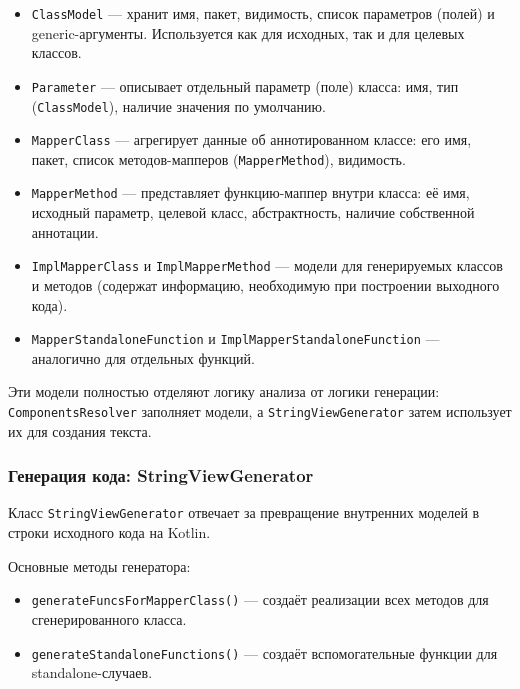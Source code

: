 \begin{itemize}
    \item \texttt{ClassModel} — хранит имя, пакет, видимость, список параметров (полей) и generic-аргументы. Используется как для исходных, так и для целевых классов.
    \item \texttt{Parameter} — описывает отдельный параметр (поле) класса: имя, тип (\texttt{ClassModel}), наличие значения по умолчанию.
    \item \texttt{MapperClass} — агрегирует данные об аннотированном классе: его имя, пакет, список методов-мапперов (\texttt{MapperMethod}), видимость.
    \item \texttt{MapperMethod} — представляет функцию-маппер внутри класса: её имя, исходный параметр, целевой класс, абстрактность, наличие собственной аннотации.
    \item \texttt{ImplMapperClass} и \texttt{ImplMapperMethod} — модели для генерируемых классов и методов (содержат информацию, необходимую при построении выходного кода).
    \item \texttt{MapperStandaloneFunction} и \texttt{ImplMapperStandaloneFunction} — аналогично для отдельных функций.
\end{itemize}

Эти модели полностью отделяют логику анализа от логики генерации: \texttt{ComponentsResolver} заполняет модели, а \texttt{StringViewGenerator} затем использует их для создания текста.

\subsubsection{Генерация кода: StringViewGenerator}

Класс \texttt{StringViewGenerator} отвечает за превращение внутренних моделей в строки исходного кода на Kotlin.

Основные методы генератора:

\begin{itemize}
    \item \texttt{generateFuncsForMapperClass()} — создаёт реализации всех методов для сгенерированного класса.
    \item \texttt{generateStandaloneFunctions()} — создаёт вспомогательные функции для standalone-случаев.
\end{itemize}

